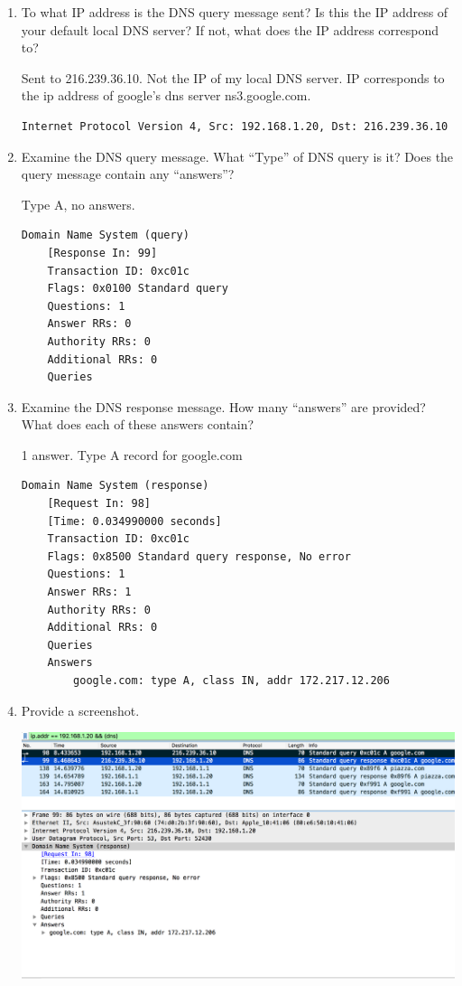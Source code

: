 \documentclass[letter,10pt]{article}
\begin{document}
\begin{enumerate}

\item To what IP address is the DNS query message sent? Is this the IP address of your
default local DNS server? If not, what does the IP address correspond to?

Sent to 216.239.36.10. Not the IP of my local DNS server. IP corresponds to the ip address of google's dns server ns3.google.com.

\begin{verbatim}
Internet Protocol Version 4, Src: 192.168.1.20, Dst: 216.239.36.10
\end{verbatim}

\item Examine the DNS query message. What “Type” of DNS query is it? Does the
query message contain any “answers”?

Type A, no answers.

\begin{verbatim}
Domain Name System (query)
    [Response In: 99]
    Transaction ID: 0xc01c
    Flags: 0x0100 Standard query
    Questions: 1
    Answer RRs: 0
    Authority RRs: 0
    Additional RRs: 0
    Queries
\end{verbatim}

\item Examine the DNS response message. How many “answers” are provided? What
does each of these answers contain?

1 answer. Type A record for google.com

\begin{verbatim}
Domain Name System (response)
    [Request In: 98]
    [Time: 0.034990000 seconds]
    Transaction ID: 0xc01c
    Flags: 0x8500 Standard query response, No error
    Questions: 1
    Answer RRs: 1
    Authority RRs: 0
    Additional RRs: 0
    Queries
    Answers
        google.com: type A, class IN, addr 172.217.12.206

\end{verbatim}

\item Provide a screenshot.

\includegraphics[width=\textwidth]{./figures/hw6_screenshot_23.png}

\end{enumerate}
\end{document}
